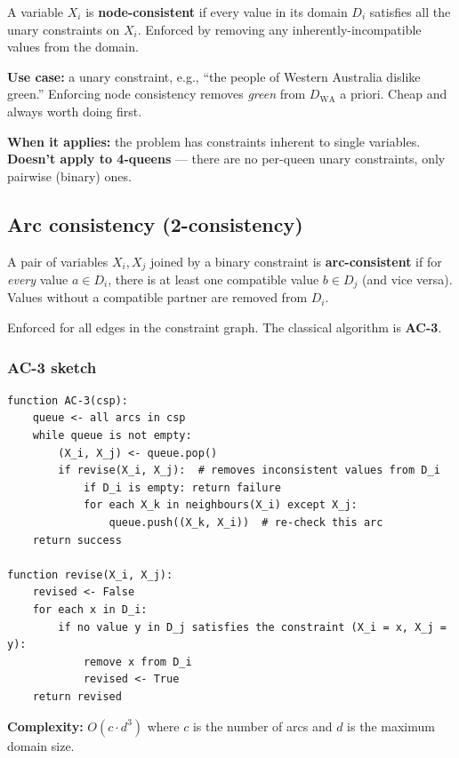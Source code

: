 \documentclass[11pt, a4paper]{article}
\begin{document}
\begin{defbox}
A variable $X_i$ is \textbf{node-consistent} if every value in its domain $D_i$ satisfies all the unary constraints on $X_i$. Enforced by removing any inherently-incompatible values from the domain.
\end{defbox}

\textbf{Use case:} a unary constraint, e.g., ``the people of Western Australia dislike green.'' Enforcing node consistency removes \emph{green} from $D_{\text{WA}}$ a priori. Cheap and always worth doing first.

\textbf{When it applies:} the problem has constraints inherent to single variables. \textbf{Doesn't apply to 4-queens} — there are no per-queen unary constraints, only pairwise (binary) ones.

\subsection{Arc consistency (2-consistency)}

\begin{defbox}
A pair of variables $X_i, X_j$ joined by a binary constraint is \textbf{arc-consistent} if for \emph{every} value $a \in D_i$, there is at least one compatible value $b \in D_j$ (and vice versa). Values without a compatible partner are removed from $D_i$.
\end{defbox}

Enforced for all edges in the constraint graph. The classical algorithm is \textbf{AC-3}.

\subsubsection*{AC-3 sketch}

\begin{exbox}[AC-3 algorithm]
\begin{verbatim}
function AC-3(csp):
    queue <- all arcs in csp
    while queue is not empty:
        (X_i, X_j) <- queue.pop()
        if revise(X_i, X_j):  # removes inconsistent values from D_i
            if D_i is empty: return failure
            for each X_k in neighbours(X_i) except X_j:
                queue.push((X_k, X_i))  # re-check this arc
    return success

function revise(X_i, X_j):
    revised <- False
    for each x in D_i:
        if no value y in D_j satisfies the constraint (X_i = x, X_j = y):
            remove x from D_i
            revised <- True
    return revised
\end{verbatim}
\textbf{Complexity:} $O(c \cdot d^3)$ where $c$ is the number of arcs and $d$ is the maximum domain size.
\end{exbox}
\end{document}
